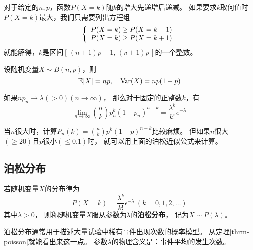 \begin{remark}
  对于给定的$n,p$，函数$P(X=k)$随$k$的增大先递增后递减。
  如果要求$k$取何值时$P(X=k)$最大，我们只需要列出方程组
  \begin{displaymath}
    \meqs{c}{
    P(X=k) \ge P(X=k-1) \\
    P(X=k) \ge P(X=k+1)}
  \end{displaymath}
  就能解得，$k$是区间$[\,(n+1)p-1,\,(n+1)p\,]$的一个整数。
\end{remark}

\begin{theorem}[二项分布的数字特征]
  设随机变量$X\sim B(n,p)$，则
  \begin{displaymath}
    \mexpect[X] = np,\quad \mvar(X) = np(1-p)
  \end{displaymath}
\end{theorem}

\begin{theorem}[泊松定理] \label{thrm-poisson}
  如果$np_n\to\lambda(>0) (n\to\infty)$，
  那么对于固定的正整数$k$，有
  \begin{displaymath}
    \lim_{n\to\infty} \binom{n}{k}p_n^k(1-p_n)^{n-k} =
      \frac{\lambda^k}{k!}e^{-\lambda}
  \end{displaymath}
\end{theorem}

\begin{remark}
  当$n$很大时，计算$P_n(k)=\binom{n}{k}p^k(1-p)^{n-k}$比较麻烦。
  但如果$n$很大$(\ge 20)$且$p$很小$(\le 0.1)$时，
  就可以用上面的泊松近似公式来计算。
\end{remark}

\subsection{泊松分布}
\begin{definition}[泊松分布]
  若随机变量$X$的分布律为
  \begin{displaymath}
    P(X=k)=\frac{\lambda^k}{k!}e^{-\lambda}\ (k=0,1,2,\dots)
  \end{displaymath}
  其中$\lambda > 0$，
  则称随机变量$X$服从参数为$\lambda$的\textbf{泊松分布}，
  记为$X\sim P(\lambda)$。
\end{definition}

\begin{remark}
  泊松分布通常用于描述大量试验中稀有事件出现次数的概率模型。
  从定理\ref{thrm-poisson}就能看出来这一点。
  参数$\lambda$的物理含义是：事件平均的发生次数。
\end{remark}

